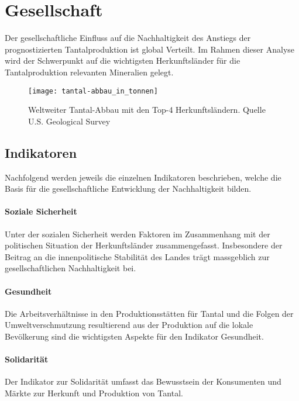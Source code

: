 \section{Gesellschaft}\label{sec:society}

Der gesellschaftliche Einfluss auf die Nachhaltigkeit des Anstiegs der
prognostizierten Tantalproduktion ist global Verteilt. Im Rahmen dieser Analyse
wird der Schwerpunkt auf die wichtigsten Herkunftsländer für die
Tantalproduktion relevanten Mineralien gelegt.

\begin{figure}[h]
    \centering
    \texttt{[image: tantal-abbau\_in\_tonnen]}
    \caption{Weltweiter Tantal-Abbau mit den Top-4 Herkunftsländern. Quelle U.S. Geological Survey ~\cite{USGSMine8}}
    \label{}
\end{figure}

\subsection{Indikatoren}

Nachfolgend werden jeweils die einzelnen Indikatoren beschrieben, welche die
Basis für die gesellschaftliche Entwicklung der Nachhaltigkeit bilden.

\paragraph{Soziale Sicherheit}

Unter der sozialen Sicherheit werden Faktoren im Zusammenhang mit der
politischen Situation der Herkunftsländer zusammengefasst. Insbesondere der
Beitrag an die innenpolitische Stabilität des Landes trägt massgeblich zur
gesellschaftlichen Nachhaltigkeit bei.

\paragraph{Gesundheit}

Die Arbeitsverhältnisse in den Produktionsstätten für Tantal und die Folgen
der Umweltverschmutzung resultierend aus der Produktion auf die lokale
Bevölkerung sind die wichtigsten Aspekte für den Indikator Gesundheit.

\paragraph{Solidarität}

Der Indikator zur Solidarität umfasst das Bewusstsein der Konsumenten und
Märkte zur Herkunft und Produktion von Tantal.

